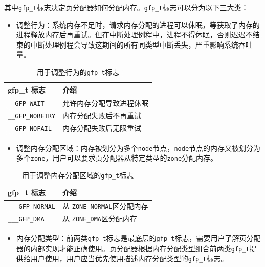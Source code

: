 \documentclass[AutoFakeBold]{LZUThesis}
\newcommand{\tightlist}{%
  \setlength{\itemsep}{0pt}\setlength{\parskip}{0pt}}
\begin{document}
\begin{sloppypar}
其中\texttt{gfp\_t}标志决定页分配器如何分配内存。\texttt{gfp\_t}标志可以分为以下三大类：

\begin{itemize}
\tightlist
\item
  调整行为：系统内存不足时，请求内存分配的进程可以休眠，等获取了内存的进程释放内存后再重试。但在中断处理例程中，进程不得休眠，否则迟迟不结束的中断处理例程会导致这期间的所有同类型中断丢失，严重影响系统吞吐量。
\end{itemize}

\begin{longtable}[htb]{@{}ll@{}}
\caption{用于调整行为的\texttt{gfp\_t}标志}\label{table:gfp-action-modifier} \\
\toprule\noalign{}
gfp\_t 标志 & 介绍 \\
\midrule\noalign{}
\endhead
\bottomrule\noalign{}
\endlastfoot
\texttt{\_\_GFP\_WAIT} & 允许内存分配导致进程休眠 \\
\texttt{\_\_GFP\_NORETRY} & 内存分配失败后不再重试 \\
\texttt{\_\_GFP\_NOFAIL} & 内存分配失败后无限重试 \\
\end{longtable}

\begin{itemize}
\tightlist
\item
  调整内存分配区域：内存被划分为多个\texttt{node}节点，\texttt{node}节点的内存又被划分为多个\texttt{zone}，用户可以要求页分配器从特定类型的\texttt{zone}分配内存。
\end{itemize}

\begin{longtable}[htb]{@{}ll@{}}
\caption{用于调整内存分配区域的\texttt{gfp\_t}标志}\label{table:gfp-zone-modifier} \\
\toprule\noalign{}
gfp\_t 标志 & 介绍 \\
\midrule\noalign{}
\endhead
\bottomrule\noalign{}
\endlastfoot
\texttt{\_\_\_GFP\_NORMAL} & 从 \texttt{ZONE\_NORMAL}区分配内存 \\
\texttt{\_\_\_GFP\_DMA} & 从 \texttt{ZONE\_DMA}区分配内存 \\
\end{longtable}

\begin{itemize}
\tightlist
\item
  内存分配类型：前两类\texttt{gfp\_t}标志是最底层的\texttt{gfp\_t}标志，需要用户了解页分配器的内部实现才能正确使用。页分配器根据内存分配类型组合前两类\texttt{gfp\_t}提供给用户使用，用户应当优先使用描述内存分配类型的\texttt{gfp\_t}标志。
\end{itemize}


\end{sloppypar}
\end{document}
